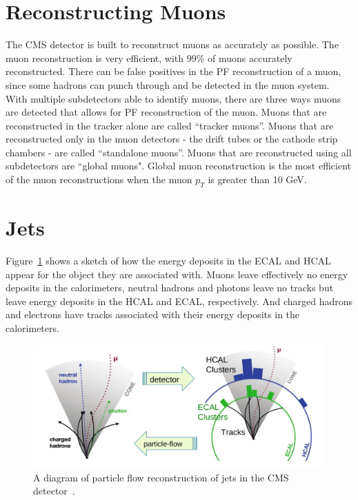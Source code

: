\section{Reconstructing Muons}

The CMS detector is built to reconstruct muons as accurately as possible. The muon reconstruction is very efficient, with 99\% of muons accurately reconstructed. There can be false positives in the PF reconstruction of a muon, since some hadrons can punch through and be detected in the muon system. With multiple subdetectors able to identify muons, there are three ways muons are detected that allows for PF reconstruction of the muon. Muons that are reconstructed in the tracker alone are called “tracker muons”. Muons that are reconstructed only in the muon detectors - the drift tubes or the cathode strip chambers - are called “standalone muons”. Muons that are reconstructed using all subdetectors are “global muons". Global muon reconstruction is the most efficient of the muon reconstructions when the muon $p_T$ is greater than 10 GeV.


\section{Jets}

Figure~\ref{fig:pflow_jets} shows a sketch of how the energy deposits in the ECAL and HCAL appear for the object they are associated with. Muons leave effectively no energy deposits in the calorimeters, neutral hadrons and photons leave no tracks but leave energy deposits in the HCAL and ECAL, respectively. And charged hadrons and electrons have tracks associated with their energy deposits in the calorimeters.


\begin{figure}[h]
\centering
\includegraphics[width=1.0\textwidth]{figures/particle_flow_pandolfi}
\caption{A diagram of particle flow reconstruction of jets in the CMS detector~\cite{pflow_pandolfi}.}
\label{fig:pflow_jets}
\end{figure}


